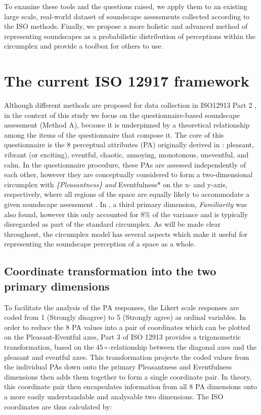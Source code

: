 \documentclass[
  authoryear,
  preprint,
  3p]{elsarticle}
\begin{document}
To examine these tools and the questions raised, we apply them to an
existing large scale, real-world dataset of soundscape assessments
collected according to the ISO methods. Finally, we propose a more
holistic and advanced method of representing soundscapes as a
probabilistic distribution of perceptions within the circumplex and
provide a toolbox for others to use.

\section{The current ISO 12917 framework}\label{sec-current}

Although different methods are proposed for data collection in ISO12913
Part 2 \citep{ISO12913_2}, in the context of this study we focus on the
questionnaire-based soundscape assessment (Method A), because it is
underpinned by a theoretical relationship among the items of the
questionnaire that compose it. The core of this questionnaire is the 8
perceptual attributes (PA) originally derived in
\citet{Axelsson2010Principal}: pleasant, vibrant (or exciting),
eventful, chaotic, annoying, monotonous, uneventful, and calm. In the
questionnaire procedure, these PAs are assessed independently of each
other, however they are conceptually considered to form a
two-dimensional circumplex with \emph{\{Pleasantness\} and
}Eventfulness* on the x- and y-axis, respectively, where all regions of
the space are equally likely to accommodate a given soundscape
assessment \citep{Aletta2016Soundscape}. In
\citet{Axelsson2010Principal}, a third primary dimension,
\emph{Familiarity} was also found, however this only accounted for 8\%
of the variance and is typically disregarded as part of the standard
circumplex. As will be made clear throughout, the circumplex model has
several aspects which make it useful for representing the soundscape
perception of a space as a whole.

\subsection{Coordinate transformation into the two primary
dimensions}\label{coordinate-transformation-into-the-two-primary-dimensions}

To facilitate the analysis of the PA responses, the Likert scale
responses are coded from 1 (Strongly disagree) to 5 (Strongly agree) as
ordinal variables. In order to reduce the 8 PA values into a pair of
coordinates which can be plotted on the Pleasant-Eventful axes, Part 3
of ISO 12913 \citep{ISO12913_3} provides a trigonometric transformation,
based on the \(45\circ\)-relationship between the diagonal axes and the
pleasant and eventful axes. This transformation projects the coded
values from the individual PAs down onto the primary Pleasantness and
Eventfulness dimensions then adds them together to form a single
coordinate pair. In theory, this coordinate pair then encapsulates
information from all 8 PA dimensions onto a more easily understandable
and analysable two dimensions. The ISO coordinates are thus calculated
by:
\end{document}
